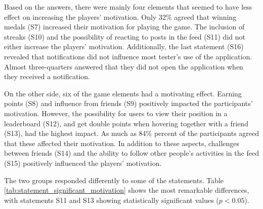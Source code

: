 Based on the answers, there were mainly four elements that seemed to have less effect on increasing the players’ motivation. Only 32\% agreed that winning medals (S7) increased their motivation for playing the game. The inclusion of streaks (S10) and the possibility of reacting to posts in the feed (S11) did not either increase the players’ motivation. Additionally, the last statement (S16) revealed that notifications did not influence most tester’s use of the application. Almost three-quarters answered that they did not open the application when they received a notification.

On the other side, six of the game elements had a motivating effect. Earning points (S8) and influence from friends (S9) positively impacted the participants’ motivation. However, the possibility for users to view their position in a leaderboard (S12), and get double points when hovering together with a friend (S13), had the highest impact. As much as 84\% percent of the participants agreed that these affected their motivation. In addition to these aspects, challenges between friends (S14) and the ability to follow other people’s activities in the feed (S15) positively influenced the players’ motivation. 

The two groups responded differently to some of the statements. Table \ref{tab:statement_significant_motivation} shows the most remarkable differences, with statements S11 and S13 showing statistically significant values ($p < 0.05$).

